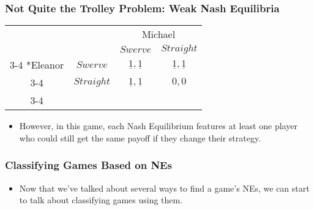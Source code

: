 \begin{frame}
\frametitle{Not Quite the Trolley Problem: Weak Nash Equilibria}
\begin{table}[h]
\centering
\begin{tabular}{cc|c|c|}
& \multicolumn{1}{c}{} & \multicolumn{2}{c}{Michael}\\
& \multicolumn{1}{c}{} & \multicolumn{1}{c}{$Swerve$}  & \multicolumn{1}{c}{$Straight$} \\\cline{3-4}
\multirow{2}*{Eleanor}  & $Swerve$ & $\underline{1}, \underline{1}$ & $\underline{1}, \underline{1}$ \\\cline{3-4}
& $Straight$ & $\underline{1}, \underline{1}$ & $0, 0$ \\\cline{3-4}
\end{tabular}
\end{table}
\begin{itemize}
\item However, in this game, each Nash Equilibrium features at least one player who could still get the same payoff if they change their strategy.
\end{itemize}
\end{frame}

\begin{frame}
\frametitle{Classifying Games Based on NEs}
\begin{itemize}
	\item Now that we've talked about several ways to find a game's NEs, we can start to talk about classifying games using them.
\end{itemize}
\end{frame}

